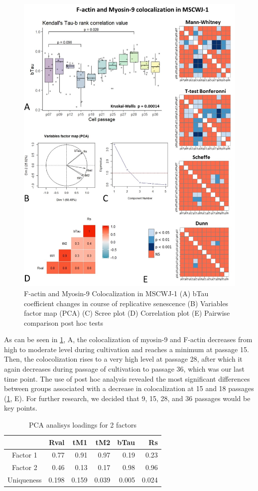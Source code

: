 \documentclass[english,authoryear]{elsarticle}
\begin{document}
\begin{figure}[hbt!]
\centering
\includegraphics[width=0.9\linewidth]{fig_m9-actin-col.jpg}
\caption{F-actin and Myosin-9 Colocalization in MSCWJ-1 (A) bTau coefficient changes in course of replicative senescence (B) Variables factor map (PCA) (C) Scree plot (D) Correlation plot (E) Pairwise comparison post hoc tests}
\label{m9-actin-col}
\end{figure}


As can be seen in \ref{m9-actin-col}, A, the colocalization of myosin-9 and F-actin decreases from high to moderate level during cultivation and reaches a minimum at passage 15.
Then, the colocolization rises to a very high level at passage 28, after which it again decreases during passage of cultivation to passage 36, which was our last time point.
The use of post hoc analysis revealed the most significant differences between groups associated with a decrease in colocalization at 15 and 18 passages (\ref{m9-actin-col}, E).
For further research, we decided that 9, 15, 28, and 36 passages would be key points.

\begin{table}[ht]
  \label{tab:pca-M9}
  \caption{PCA analisys loadings for 2 factors}
\centering
\begin{tabular}{c|rrrrr}
  \hline
  & Rval & tM1 & tM2 & bTau & Rs \\
  \hline
Factor 1 & 0.77 & 0.91 & 0.97 & 0.19 & 0.23 \\
  Factor 2 & 0.46 & 0.13 & 0.17 & 0.98 & 0.96 \\
Uniqueness &  0.198 & 0.159 & 0.039 & 0.005 & 0.024 \\
   \hline
\end{tabular}
\end{table}
\end{document}
